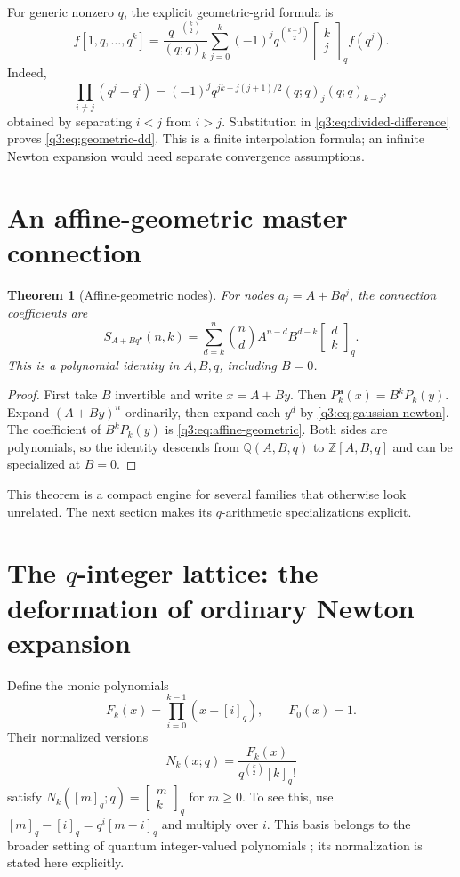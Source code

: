 \documentclass[11pt,a4paper,oneside,openany]{book}
\newtheorem{theorem}{Theorem}[chapter]
\theoremstyle{definition}
\theoremstyle{remark}
\newcommand{\Z}{\mathbb Z}
\newcommand{\Q}{\mathbb Q}
\newcommand{\GB}[3][q]{\begin{bmatrix}#2\\#3\end{bmatrix}_{#1}}
\newcommand{\qi}[2][q]{[#2]_{#1}}
\newcommand{\qf}[2][q]{[#2]_{#1}!}
\newcommand{\qb}[2]{\GB{#1}{#2}}
\newcommand{\G}[2]{\GB{#1}{#2}}
\begin{document}
For generic nonzero $q$, the explicit geometric-grid formula is
\begin{equation}
 f[1,q,\ldots,q^k]
 =\frac{q^{-\binom k2}}{(q;q)_k}
   \sum_{j=0}^k(-1)^jq^{\binom{k-j}2}\G kj f(q^j).
 \label{q3:eq:geometric-dd}
\end{equation}
Indeed,
\begin{equation}
 \prod_{i\ne j}(q^j-q^i)
 =(-1)^jq^{jk-j(j+1)/2}(q;q)_j(q;q)_{k-j},
 \label{q3:eq:geometric-denominator}
\end{equation}
obtained by separating $i<j$ from $i>j$. Substitution in
\cref{q3:eq:divided-difference} proves \cref{q3:eq:geometric-dd}.
This is a finite interpolation formula; an infinite Newton expansion
would need separate convergence assumptions.

\section{An affine-geometric master connection}
\begin{theorem}[Affine-geometric nodes]
\label{q3:thm:affine}
For nodes $a_j=A+Bq^j$, the connection coefficients are
\begin{equation}
 S_{A+Bq^\bullet}(n,k)
 =\sum_{d=k}^n\binom nd A^{n-d}B^{d-k}\G dk.
 \label{q3:eq:affine-geometric}
\end{equation}
This is a polynomial identity in $A,B,q$, including $B=0$.
\end{theorem}
\begin{proof}
First take $B$ invertible and write $x=A+By$. Then
$P_k^{\boldsymbol a}(x)=B^kP_k(y)$. Expand $(A+By)^n$ ordinarily,
then expand each $y^d$ by \cref{q3:eq:gaussian-newton}. The coefficient of
$B^kP_k(y)$ is \cref{q3:eq:affine-geometric}. Both sides are polynomials,
so the identity descends from $\Q(A,B,q)$ to $\Z[A,B,q]$ and can be
specialized at $B=0$.
\end{proof}
This theorem is a compact engine for several families that otherwise
look unrelated. The next section makes its $q$-arithmetic specializations
explicit.
\section{The \texorpdfstring{$q$}{q}-integer lattice: the deformation of ordinary Newton expansion}
Define the monic polynomials
\begin{equation}\label{q2:eq:Fk}
 F_k(x)=\prod_{i=0}^{k-1}(x-\qi i),\qquad F_0(x)=1.
\end{equation}
Their normalized versions
\[
 N_k(x;q)=\frac{F_k(x)}{q^{\binom k2}\qf k}
\]
satisfy $N_k(\qi m;q)=\qb mk$ for $m\ge0$. To see this, use
$\qi m-\qi i=q^i\qi{m-i}$ and multiply over $i$.
This basis belongs to the broader setting of quantum integer-valued polynomials
\cite{harmanhopkins}; its normalization is stated here explicitly.
\end{document}
